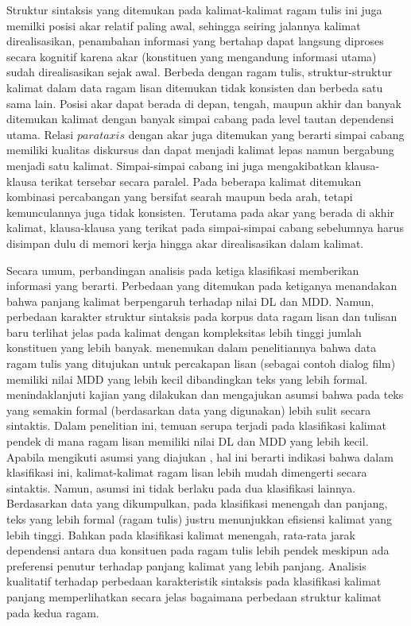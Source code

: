 Struktur sintaksis yang ditemukan pada kalimat-kalimat ragam tulis ini juga memilki posisi akar relatif paling awal, sehingga seiring jalannya kalimat direalisasikan, penambahan informasi yang bertahap dapat langsung diproses secara kognitif karena akar (konstituen yang mengandung informasi utama) sudah direalisasikan sejak awal. Berbeda dengan ragam tulis, struktur-struktur kalimat dalam data ragam lisan ditemukan tidak konsisten dan berbeda satu sama lain. Posisi akar dapat berada di depan, tengah, maupun akhir dan banyak ditemukan kalimat dengan banyak simpai cabang pada level tautan dependensi utama. Relasi $parataxis$ dengan akar juga ditemukan yang berarti simpai cabang memiliki kualitas diskursus dan dapat menjadi kalimat lepas namun bergabung menjadi satu kalimat. Simpai-simpai cabang ini juga mengakibatkan klausa-klausa terikat tersebar secara paralel. Pada beberapa kalimat ditemukan kombinasi percabangan yang bersifat searah maupun beda arah, tetapi kemunculannya juga tidak konsisten. Terutama pada akar yang berada di akhir kalimat, klausa-klausa yang terikat pada simpai-simpai cabang sebelumnya harus disimpan dulu di memori kerja hingga akar direalisasikan dalam kalimat. 

Secara umum, perbandingan analisis pada ketiga klasifikasi memberikan informasi yang berarti. Perbedaan yang ditemukan pada ketiganya menandakan bahwa panjang kalimat berpengaruh terhadap nilai DL dan MDD. Namun, perbedaan karakter struktur sintaksis pada korpus data ragam lisan dan tulisan baru terlihat jelas pada kalimat dengan kompleksitas lebih tinggi jumlah konstituen yang lebih banyak. \cite{wang2017effects} menemukan dalam penelitiannya bahwa data ragam tulis yang ditujukan untuk percakapan lisan (sebagai contoh dialog film) memiliki nilai MDD yang lebih kecil dibandingkan teks yang lebih formal. \cite{wang2017effects} menindaklanjuti kajian yang dilakukan \cite{hiranuma1999syntactic} dan \cite{liu2009chinese} mengajukan asumsi bahwa pada teks yang semakin formal (berdasarkan data yang digunakan) lebih sulit secara sintaktis. Dalam penelitian ini, temuan serupa terjadi pada klasifikasi kalimat pendek di mana ragam lisan memiliki nilai DL dan MDD yang lebih kecil. Apabila mengikuti asumsi yang diajukan \cite{wang2017effects}, hal ini berarti indikasi bahwa dalam klasifikasi ini, kalimat-kalimat ragam lisan lebih mudah dimengerti secara sintaktis. Namun, asumsi ini tidak berlaku pada dua klasifikasi lainnya. Berdasarkan data yang dikumpulkan, pada klasifikasi menengah dan panjang, teks yang lebih formal (ragam tulis) justru menunjukkan efisiensi kalimat yang lebih tinggi. Bahkan pada klasifikasi kalimat menengah, rata-rata jarak dependensi antara dua konsituen pada ragam tulis lebih pendek meskipun ada preferensi penutur terhadap panjang kalimat yang lebih panjang. Analisis kualitatif terhadap perbedaan karakteristik sintaksis pada klasifikasi kalimat panjang memperlihatkan secara jelas bagaimana perbedaan struktur kalimat pada kedua ragam. 


